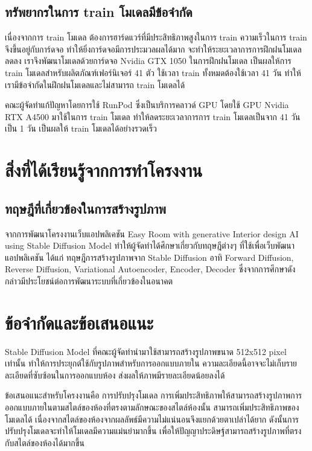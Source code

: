 \documentclass[12pt,oneside,openright,a4paper]{cpe-thai-project}
\begin{document}
\subsection{ทรัพยากรในการ train โมเดลมีข้อจำกัด}
\hspace{18pt}เนื่องจากการ train โมเดล ต้องการฮาร์ดแวร์ที่มีประสิทธิภาพสูงในการ train ความเร็วในการ train จึงขึ้นอยู่กับการ์ดจอ ทำให้ยิ่งการ์ดจอมีการประมวลผลได้มาก จะทำให้ระยะเวลาการการฝึกฝนโมเดลลดลง
เราจึงพัฒนาโมเดลด้วยการ์ดจอ Nvidia GTX 1050 ในการฝึกฝนโมเดล เป็นผลให้การ train โมเดลสำหรับผลิตภัณฑ์เฟอร์นิเจอร์ 41 ตัว ใช้เวลา train ทั้งหมดต้องใช้เวลา 41 วัน ทำให้เรามีข้อจำกัดในฝึกฝนโมเดลและไม่สามารถ train โมเดลได้

\hspace{18pt}คณะผู้จัดทำแก้ปัญหาโดยการใช้ RunPod ซึ่งเป็นบริการคลาวด์ GPU โดยใช้ GPU Nvidia RTX A4500 มาใช้ในการ train โมเดล ทำให้ลดระยะเวลาการการ train โมเดลเป็นจาก 41 วัน เป็น 1 วัน เป็นผลให้ train โมเดลได้อย่างรวดเร็ว

\section{สิ่งที่ได้เรียนรู้จากการทําโครงงาน}
\subsection{ทฤษฎีที่เกี่ยวข้องในการสร้างรูปภาพ}
\hspace{18pt}จากการพัฒนาโครงงานเว็บแอปพลิเคชัน Easy Room with generative Interior design AI using Stable Diffusion Model ทําให้ผู้จัดทําได้ศึกษาเกี่ยวกับทฤษฎีต่างๆ ที่ใช้เพื่อเว็บพัฒนาแอปพลิเคชัน ได้แก่
ทฤษฎีการสร้างรูปภาพจาก Stable Diffusion อาทิ Forward Diffusion, Reverse Diffusion, Variational Autoencoder, Encoder, Decoder ซึ่งจากการศึกษาดังกล่าวมีประโยชน์ต่อการพัฒนาระบบที่เกี่ยวข้องในอนาคต


\section{ข้อจำกัดและข้อเสนอแนะ}
\hspace{18pt}Stable Diffusion Model ที่คณะผู้จัดทำนำมาใช้สามารถสร้างรูปภาพขนาด 512x512 pixel เท่านั้น ทำให้การประยุกต์ใช้กับรูปภาพสำหรับการออกแบบภายใน ความละเอียดนี้อาจจะไม่เก็บรายละเอียดที่ซับซ้อนในการออกแบบห้อง ส่งผลให้ภาพมีรายละเอียดน้อยลงได้

\hspace{18pt}ข้อเสนอแนะสำหรับโครงงานคือ การปรับปรุงโมเดล การเพิ่มประสิทธิภาพให้สามารถสร้างรูปภาพการออกแบบภายในตามสไตล์ของห้องที่ตรงตามลักษณะของสไตล์ห้องนั้น สามารถเพิ่มประสิทธิภาพของโมเดลได้ เนื่องจากสไตล์ของห้องจากผลลัพธ์มีความไม่แน่นอนจึงแยกด้วยตาเปล่าได้ยาก
ดังนั้นการปรับปรุงโมเดลจะทำให้โมเดลมีความแม่นยำมากขึ้น เพื่อให้ปัญญาประดิษฐ์สามารถสร้างรูปภาพที่ตรงกับสไตล์ของห้องได้มากขึ้น
\end{document}
